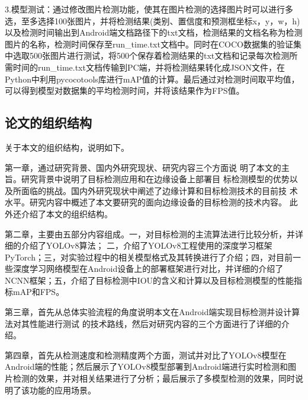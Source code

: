 \documentclass{ctexart}
\numberwithin{equation}{section}%
\numberwithin{figure}{section}%
\numberwithin{table}{section}%
\begin{document}
	3.模型测试：通过修改图片检测功能，使其在图片检测的选择图片时可以进行多选，至多选择100张图片，并将检测结果(类别、置信度和预测框坐标x，y，w，h)以及检测时间输出到Android端文档路径下的txt文档，检测结果的文档名称为检测图片的名称，检测时间保存至run\_time.txt文档中。同时在COCO数据集的验证集中选取500张图片进行测试，将500个保存着检测结果的txt文档和记录每次检测所需时间的run\_time.txt文档传输到PC端，并将检测结果转化成JSON文件，在Python中利用pycocotools库进行mAP值的计算。最后通过对检测时间取平均值，可以得到模型对数据集的平均检测时间，并将该结果作为FPS值。
	
	\subsection{论文的组织结构}
	关于本文的组织结构，说明如下。
	
	第一章，通过研究背景、国内外研究现状、研究内容三个方面说
	明了本文的主旨。研究背景中说明了目标检测应用和在边缘设备上部署目
	标检测模型的优势以及所面临的挑战。国内外研究现状中阐述了边缘计算和目标检测技术的目前技
	术水平。研究内容中概述了本文要研究的面向边缘设备的目标检测的技术内容。
	此外还介绍了本文的组织结构。
	
	第二章，主要由五部分内容组成。一，对目标检测的主流算法进行比较分析，并详细的介绍了YOLOv8算法；
	二，介绍了YOLOv8工程使用的深度学习框架PyTorch；三，对实验过程中的相关模型格式及其转换进行了介绍；四，对目前一些深度学习网络模型在Android设备上的部署框架进行对比，并详细的介绍了NCNN框架；五，介绍了目标检测中IOU的含义和计算以及目标检测模型的性能指标mAP和FPS。

	第三章，首先从总体实验流程的角度说明本文在Android端实现目标检测并设计算法对其性能进行测试
	的技术路线，然后对研究内容的三个方面进行了详细的介绍。

	第四章，首先从检测速度和检测精度两个方面，测试并对比了YOLOv8模型在Android端的性能；然后展示了YOLOv8模型部署到Android端进行实时检测和图片检测的效果，并对相关结果进行了分析；最后展示了多模型检测的效果，同时说明了该功能的应用场景。

	
\end{document}
